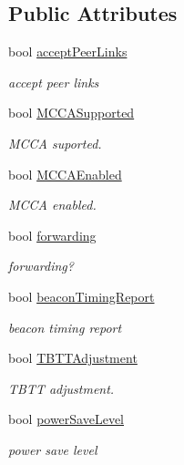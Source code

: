 \subsection*{Public Attributes}
\begin{DoxyCompactItemize}
\item 
bool \hyperlink{classns3_1_1dot11s_1_1Dot11sMeshCapability_a74a26f93018926b18b14e4031b177180}{accept\+Peer\+Links}
\begin{DoxyCompactList}\small\item\em accept peer links \end{DoxyCompactList}\item 
bool \hyperlink{classns3_1_1dot11s_1_1Dot11sMeshCapability_af564c2e49d1af39003b9260e2188e157}{M\+C\+C\+A\+Supported}
\begin{DoxyCompactList}\small\item\em M\+C\+CA suported. \end{DoxyCompactList}\item 
bool \hyperlink{classns3_1_1dot11s_1_1Dot11sMeshCapability_ad9e279f25aaca6f19a8251b6c5235db4}{M\+C\+C\+A\+Enabled}
\begin{DoxyCompactList}\small\item\em M\+C\+CA enabled. \end{DoxyCompactList}\item 
bool \hyperlink{classns3_1_1dot11s_1_1Dot11sMeshCapability_abfd5ebb63d139812a80820ff5cc5740c}{forwarding}
\begin{DoxyCompactList}\small\item\em forwarding? \end{DoxyCompactList}\item 
bool \hyperlink{classns3_1_1dot11s_1_1Dot11sMeshCapability_ac1e3769c0dd485212f89fba050324b72}{beacon\+Timing\+Report}
\begin{DoxyCompactList}\small\item\em beacon timing report \end{DoxyCompactList}\item 
bool \hyperlink{classns3_1_1dot11s_1_1Dot11sMeshCapability_adecf19126b3a6de0be14f65b814aa6ef}{T\+B\+T\+T\+Adjustment}
\begin{DoxyCompactList}\small\item\em T\+B\+TT adjustment. \end{DoxyCompactList}\item 
bool \hyperlink{classns3_1_1dot11s_1_1Dot11sMeshCapability_aa25d9a3781b4fa1d83808d4b28598d8e}{power\+Save\+Level}
\begin{DoxyCompactList}\small\item\em power save level \end{DoxyCompactList}\end{DoxyCompactItemize}
